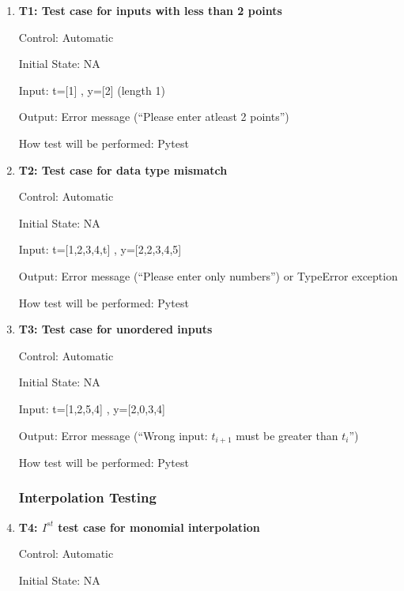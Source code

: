 \documentclass[12pt, titlepage]{article}
\begin{document}
\begin{enumerate}

\item{\textbf{T1: Test case for inputs with less than 2 points}\\}

Control: Automatic

Initial State: NA

Input: t=[1] , y=[2] (length 1)

Output: Error message (``Please enter atleast 2 points'')

How test will be performed: Pytest




\item{\textbf{T2: Test case for data type mismatch}\\}

Control: Automatic

Initial State: NA

Input: t=[1,2,3,4,t] , y=[2,2,3,4,5] 

Output: Error message (``Please enter only numbers'') or TypeError exception

How test will be performed: Pytest




\item{\textbf{T3: Test case for unordered inputs}\\}

Control: Automatic

Initial State: NA

Input: t=[1,2,5,4] , y=[2,0,3,4] 

Output: Error message (``Wrong input: $t_{i+1}$ must be greater than $t_i$'')

How test will be performed: Pytest



\subsubsection{Interpolation Testing}




\item{\textbf{T4: $I^{st}$ test case for monomial interpolation} \\}

Control: Automatic 

Initial State: NA


\end{enumerate}
\end{document}
